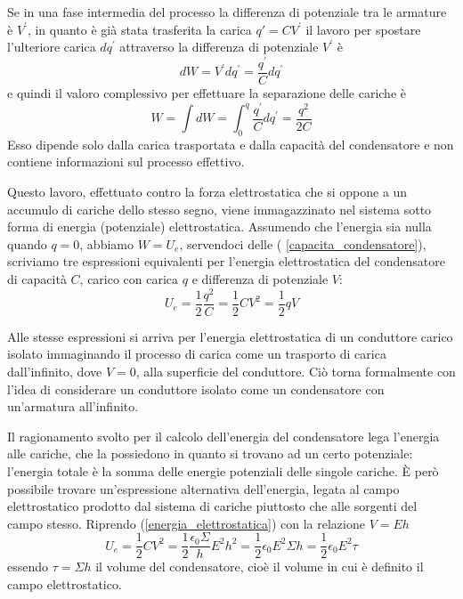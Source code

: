 \documentclass[class=book, crop=false, oneside, 12pt]{standalone}
\begin{document}
Se in una fase intermedia del processo la differenza di potenziale tra le armature è \(V^{\prime}\), in quanto è già stata trasferita la carica \(q' = C V^{\prime}\) il lavoro per spostare l'ulteriore carica \(dq^{\prime}\) attraverso la differenza di potenziale \(V^{\prime}\) è
\begin{equation*}
    d W = V^{\prime} d q^{\prime} = \frac{q^{\prime}}{C} d q^{\prime}
\end{equation*}
e quindi il valoro complessivo per effettuare la separazione delle cariche è
\begin{equation*}
    W = \int dW = \int_0^q \frac{q^{\prime}}{C}d q^{\prime} = \frac{q^2}{2 C}
\end{equation*}
Esso dipende solo dalla carica trasportata e dalla capacità del condensatore e non contiene informazioni sul processo effettivo.

Questo lavoro, effettuato contro la forza elettrostatica che si oppone a un accumulo di cariche dello stesso segno, viene immagazzinato nel sistema sotto forma di energia (potenziale) elettrostatica. 
Assumendo che l'energia sia nulla quando \(q = 0\), abbiamo \(W = U_e\), servendoci delle ( \ref{capacita_condensatore}), scriviamo tre espressioni equivalenti per l'energia elettrostatica del condensatore di capacità \(C\), carico con carica \(q\) e differenza di potenziale \(V\):
\begin{equation} \label{energia_elettrostatica}
    U_e = \frac{1}{2} \frac{q^2}{C} = \frac{1}{2} C V^2 = \frac{1}{2} q V
\end{equation} 

Alle stesse espressioni si arriva per l'energia elettrostatica di un conduttore carico isolato immaginando il processo di carica come un trasporto di carica dall'infinito, dove \(V = 0\), alla superficie del conduttore. 
Ciò torna formalmente con l'idea di considerare un conduttore isolato come un condensatore con un'armatura all'infinito.

Il ragionamento svolto per il calcolo dell'energia del condensatore lega l'energia alle cariche, che la possiedono in quanto si trovano ad un certo potenziale: l'energia totale è la somma delle energie potenziali delle singole cariche. 
È però possibile trovare un'espressione alternativa dell'energia, legata al campo elettrostatico prodotto dal sistema di cariche piuttosto che alle sorgenti del campo stesso.
Riprendo (\ref{energia_elettrostatica}) con la relazione \(V =Eh\)
\begin{equation*}
    U_e = \frac{1}{2} C V^2 = \frac{1}{2} \frac{\epsilon_0 \Sigma}{h} E^2 h^2 = \frac{1}{2} \epsilon_0 E^2 \Sigma h = \frac{1}{2} \epsilon_0 E^2 \tau
\end{equation*}
essendo \(\tau = \Sigma h\) il volume del condensatore, cioè il volume in cui è definito il campo elettrostatico.
\end{document}
